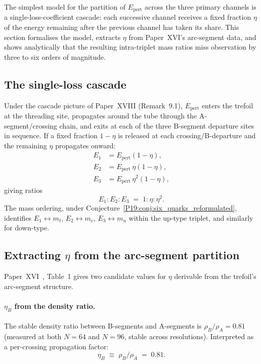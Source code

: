 \documentclass[11pt,a4paper]{article}
\theoremstyle{definition}\newtheorem{definition}[theorem]{Definition}
\theoremstyle{remark}
\begin{document}
The simplest model for the partition of $E_{\mathrm{pert}}$ across
the three primary channels is a single-loss-coefficient cascade:
each successive channel receives a fixed fraction $\eta$ of the
energy remaining after the previous channel has taken its share.
This section formalises the model, extracts $\eta$ from Paper~XVI's
arc-segment data, and shows analytically that the resulting
intra-triplet mass ratios miss observation by three to six orders
of magnitude.

\subsection{The single-loss cascade}

Under the cascade picture of Paper~XVIII (Remark~9.1), %
$E_{\mathrm{pert}}$ enters the trefoil at the threading site,
propagates around the tube through the A-segment/crossing chain,
and exits at each of the three B-segment departure sites in
sequence.  If a fixed fraction $1-\eta$ is released at each
crossing/B-departure and the remaining $\eta$ propagates onward:
\begin{align}
  E_1 &= E_{\mathrm{pert}}(1-\eta), \\
  E_2 &= E_{\mathrm{pert}}\,\eta(1-\eta), \\
  E_3 &= E_{\mathrm{pert}}\,\eta^2(1-\eta),
  \label{P19:eq:cascade_energies}
\end{align}
giving ratios
\begin{equation}
  E_1:E_2:E_3 \;=\; 1 : \eta : \eta^2.
  \label{P19:eq:cascade_ratio}
\end{equation}
The mass ordering, under
Conjecture~\ref{P19:conj:six_quarks_reformulated}, identifies
$E_1\leftrightarrow m_t$, $E_2\leftrightarrow m_c$,
$E_3\leftrightarrow m_u$ within the up-type triplet, and similarly
for down-type.

\subsection{Extracting $\eta$ from the arc-segment partition}

Paper~XVI~\cite{Paper16}, Table~1 gives two candidate values for
$\eta$ derivable from the trefoil's arc-segment structure.

\paragraph{$\eta_B$ from the density ratio.}  The stable density
ratio between B-segments and A-segments is
$\rho_B/\rho_A=0.81$ (measured at both $N=64$ and $N=96$, stable
across resolutions).  Interpreted as a per-crossing propagation
factor:
\begin{equation}
  \eta_B \;\equiv\; \rho_B/\rho_A \;=\; 0.81.
  \label{P19:eq:eta_B}
\end{equation}
\end{document}
